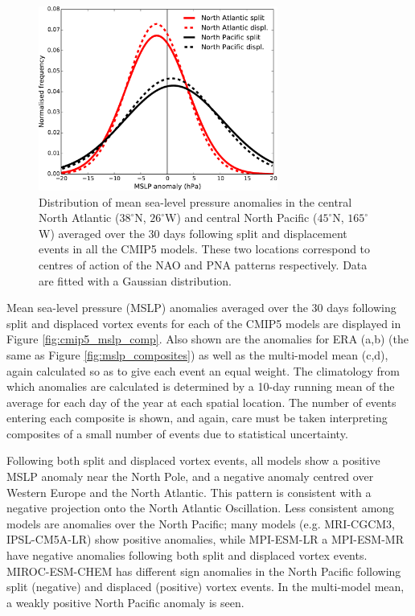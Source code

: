 \begin{figure}
 \centering
 \noindent\includegraphics[width=0.7\textwidth]{figures/chapter-models/NAO_PNA_histogram.pdf}
 \caption[Distribution of MSLP anomalies in North Pacific and Atlantic following
 splits and displacements.]{Distribution of mean sea-level pressure anomalies in
   the central North Atlantic ($38^{\circ}$N, $26^{\circ}$W) and central North
   Pacific ($45^{\circ}$N, $165^{\circ}$W) averaged over the 30 days following
   split and displacement events in all the CMIP5 models. These two locations
   correspond to centres of action of the NAO and PNA patterns
   respectively. Data are fitted with a Gaussian distribution.}
 \label{fig:cmip5_nao_pna}
\end{figure}

Mean sea-level pressure (MSLP) anomalies averaged over the 30 days following
split and displaced vortex events for each of the CMIP5 models are displayed in
Figure \ref{fig:cmip5_mslp_comp}. Also shown are the anomalies for ERA (a,b)
(the same as Figure \ref{fig:mslp_composites}) as well as the multi-model mean
(c,d), again calculated so as to give each event an equal weight. The
climatology from which anomalies are calculated is determined by a 10-day
running mean of the average for each day of the year at each spatial
location. The number of events entering each composite is shown, and again, care
must be taken interpreting composites of a small number of events due to
statistical uncertainty.

Following both split and displaced vortex events, all models show a positive
MSLP anomaly near the North Pole, and a negative anomaly centred over Western
Europe and the North Atlantic. This pattern is consistent with a negative
projection onto the North Atlantic Oscillation. Less consistent among models are
anomalies over the North Pacific; many models (e.g. MRI-CGCM3, IPSL-CM5A-LR)
show positive anomalies, while MPI-ESM-LR a MPI-ESM-MR have negative anomalies
following both split and displaced vortex events. MIROC-ESM-CHEM has different
sign anomalies in the North Pacific following split (negative) and displaced
(positive) vortex events. In the multi-model mean, a weakly positive North
Pacific anomaly is seen.

